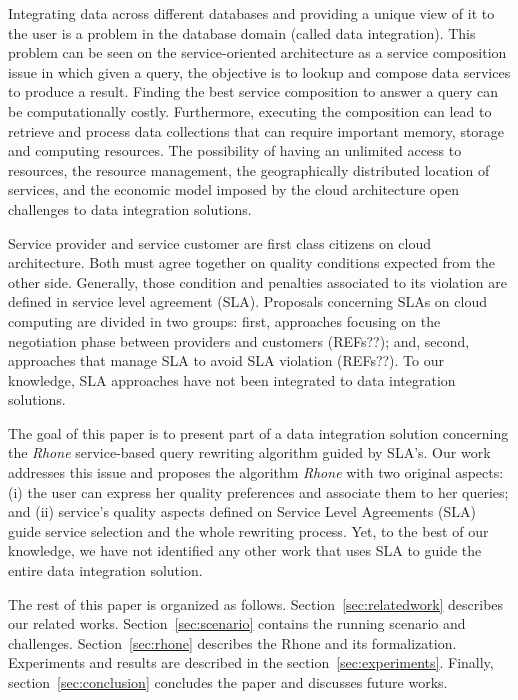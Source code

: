 Integrating data across different databases and providing a unique view of it to the user is a problem in the database domain (called data integration).
This problem can be seen on the service-oriented architecture as a service composition issue in which given a query, the objective is to lookup and compose data services to produce a result. 
%
Finding the best service composition to answer a query can be computationally costly. 
Furthermore, executing the composition can lead to retrieve and process data collections that can require important memory, storage and computing resources.
The possibility of having an unlimited access to resources, the resource management, the geographically distributed location of services, and the economic model imposed by the cloud architecture open challenges to data integration solutions.

Service provider and service customer are first class citizens on cloud architecture.
Both must agree together on quality conditions expected from the other side. 
Generally, those condition and penalties associated to its violation are defined in service level 
agreement (SLA). 
Proposals concerning SLAs on cloud computing are divided in two groups: first, approaches focusing on the negotiation phase between providers and customers (REFs??); and, second, approaches that manage SLA to avoid SLA violation (REFs??).
To our knowledge, SLA approaches have not been integrated to data integration solutions.

The goal of this paper is to present part of a data integration solution concerning the \textit{Rhone} service-based query rewriting algorithm guided by SLA's. 
Our work addresses this issue and proposes the algorithm \textit{Rhone} with two original aspects: (i) the user can express her quality preferences and associate them to her queries; and (ii)  service's quality aspects defined on Service Level Agreements (SLA) guide service selection and the whole rewriting process.
Yet, to the best of our knowledge, we have not identified any other work that uses SLA to guide the entire data integration solution.

The rest of this paper is organized as follows. 
Section~\ref{sec:relatedwork} describes our related works. 
Section~\ref{sec:scenario} contains the running scenario and challenges.
Section~\ref{sec:rhone} describes the Rhone and its formalization. 
Experiments and results are described in the section~\ref{sec:experiments}. 
Finally, section~\ref{sec:conclusion} concludes the paper and discusses future works.
